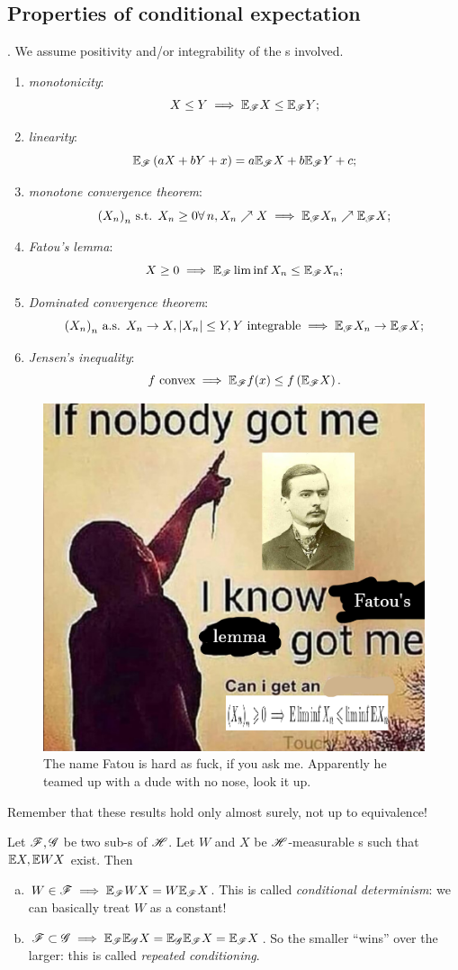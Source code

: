 \documentclass{report}
\begin{document}
\subsection{Properties of conditional expectation}.
We assume positivity and/or integrability of the \rv s involved. 
\begin{enumerate}[\circnum]
	\item \emph{monotonicity}:
	\[X\leq Y\implies\mathbb{E}_{\mathscr{F}} X\leq\mathbb{E}_{\mathscr{F}} Y;\]
	\item \emph{linearity}:
	\[\mathbb{E}_{\mathscr{F}}\left(aX+bY+x\right)=a\mathbb{E}_{\mathscr{F}} X+b\mathbb{E}_{\mathscr{F}} Y+c;\]
	\item \emph{monotone convergence theorem}:
	\[{(X_{n})}_{n}\text{ s.t. }X_{n}\geq 0\forall\, n,X_n\nearrow X\implies\mathbb{E}_{\mathscr{F}} X_n\nearrow\mathbb{E}_{\mathscr{F}} X;\]
	\item \emph{Fatou's lemma}:
	\[X\geq0\implies \mathbb{E}_{\mathscr{F}}\liminf X_n\leq\mathbb{E}_{\mathscr{F}} X_n;\]
	\item \emph{Dominated convergence theorem}:
	\[{(X_{n})}_{n}\text{ a.s. }X_n\to X,|X_n|\leq Y,Y\text{ integrable}\implies\mathbb{E}_{\mathscr{F}} X_n\to\mathbb{E}_{\mathscr{F}} X;\]
	\item \emph{Jensen's inequality}:
	\[f\text{ convex}\implies \mathbb{E}_{\mathscr{F}} f(x)\leq f\left(\mathbb{E}_{\mathscr{F}} X\right).\]
\end{enumerate}
\begin{figure}[h]
	\centering
	\includegraphics[width=0.6\linewidth]{fatou}
	\caption{The name Fatou is hard as fuck, if you ask me. Apparently he teamed up with a dude with no nose, look it up.}
	\label{fig:fatou}
\end{figure}
Remember that these results hold only almost surely, not up to equivalence!
\begin{theorem}
	Let $\mathscr{F},\mathscr{G}$ be two sub-\sa{}s of $\mathscr{H}$. Let $W$ and $X$ be $\mathscr{H}$-measurable \rv{}s such that $\mathbb{E} X,\mathbb{E} WX$ exist. Then
	\begin{enumerate}[a)]
		\item $W\in\mathscr{F}\implies\mathbb{E}_{\mathscr{F}} WX=W\mathbb{E}_{\mathscr{F}} X$. This is called \emph{conditional determinism}: we can basically treat $W$ as a constant!
		\item $\mathscr{F} \subset\mathscr{G}\implies\mathbb{E}_{\mathscr{F}}\mathbb{E}_{\mathscr{G}} X=\mathbb{E}_{\mathscr{G}}\mathbb{E}_{\mathscr{F}} X=\mathbb{E}_{\mathscr{F}} X$. So the smaller \sa{} ``wins'' over the larger: this is called \emph{repeated conditioning}.
	\end{enumerate}
\end{theorem}
\end{document}
